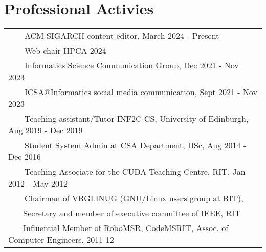 \documentclass[a4paper,10pt]{article} %
\newcommand{\tabitem}{~~\llap{\textbullet}~~}
\begin{document}
\section{Professional Activies}
\hskip-0.4cm
\begin{tabular}{l}
	\tabitem ACM SIGARCH content editor, March 2024 - Present\\
	\tabitem Web chair HPCA 2024 \\
    \tabitem Informatics Science Communication Group, Dec 2021 - Nov 2023 \\
	\tabitem ICSA@Informatics social media communication, Sept 2021 - Nov 2023 \\
	\tabitem Teaching assistant/Tutor INF2C-CS, University of Edinburgh, Aug 2019 - Dec 2019 \\
	\tabitem Student System Admin at CSA Department, IISc, Aug 2014 - Dec 2016 \\
	\tabitem Teaching Associate for the CUDA Teaching Centre, RIT, Jan 2012 - May 2012 \\
	\tabitem Chairman of VRGLINUG (GNU/Linux users group at RIT), \\
	~~~ Secretary and member of executive committee of IEEE, RIT  \\
	~~~ Influential Member of {\footnotesize RoboMSR, CodeMSRIT, Assoc. of Computer Engineers}, 2011-12 \\
\end{tabular}


\iffalse
\end{document}
